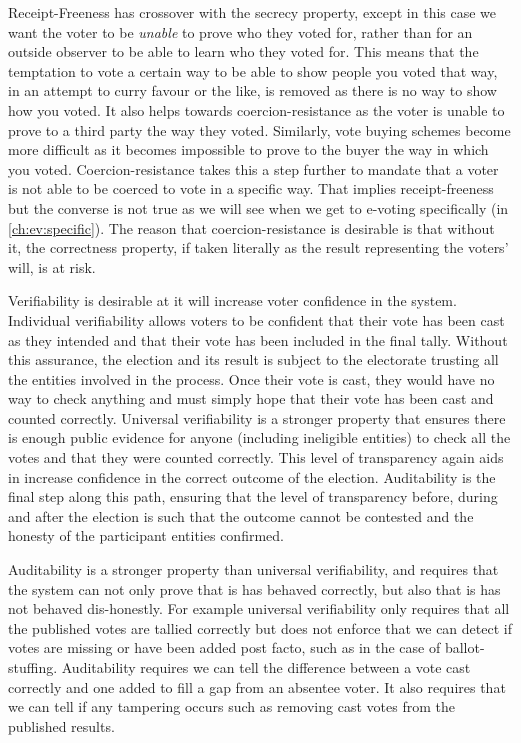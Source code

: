 Receipt-Freeness has crossover with the secrecy property, except in this case we want the voter to be \emph{unable} to prove who they voted for, rather than for an outside observer to be able to learn who they voted for. This means that the temptation to vote a certain way to be able to show people you voted that way, in an attempt to curry favour or the like, is removed as there is no way to show how you voted. It also helps towards coercion-resistance as the voter is unable to prove to a third party the way they voted. Similarly, vote buying schemes become more difficult as it becomes impossible to prove to the buyer the way in which you voted. Coercion-resistance takes this a step further to mandate that a voter is not able to be coerced to vote in a specific way. That implies receipt-freeness but the converse is not true as we will see when we get to e-voting specifically (in \autoref{ch:ev:specific}). The reason that coercion-resistance is desirable is that without it, the correctness property, if taken literally as the result representing the voters' will, is at risk.

Verifiability is desirable at it will increase voter confidence in the system. Individual verifiability allows voters to be confident that their vote has been cast as they intended and that their vote has been included in the final tally. Without this assurance, the election and its result is subject to the electorate trusting all the entities involved in the process. Once their vote is cast, they would have no way to check anything and must simply hope that their vote has been cast and counted correctly. Universal verifiability is a stronger property that ensures there is enough public evidence for anyone (including ineligible entities) to check all the votes and that they were counted correctly. This level of transparency again aids in increase confidence in the correct outcome of the election. Auditability is the final step along this path, ensuring that the level of transparency before, during and after the election is such that the outcome cannot be contested and the honesty of the participant entities confirmed.

Auditability is a stronger property than universal verifiability, and requires that the system can not only prove that is has behaved correctly, but also that is has not behaved dis-honestly. For example universal verifiability only requires that all the published votes are tallied correctly but does not enforce that we can detect if votes are missing or have been added post facto, such as in the case of ballot-stuffing. Auditability requires we can tell the difference between a vote cast correctly and one added to fill a gap from an absentee voter. It also requires that we can tell if any tampering occurs such as removing cast votes from the published results.

